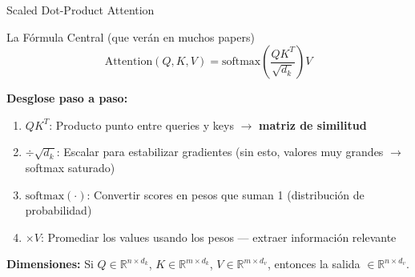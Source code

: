 \documentclass[aspectratio=169]{beamer}
\begin{document}
\begin{frame}{Scaled Dot-Product Attention}
    \begin{block}{La Fórmula Central (que verán en muchos papers)}
        \begin{equation*}
            \text{Attention}(Q, K, V) = \text{softmax}\left(\frac{QK^T}{\sqrt{d_k}}\right)V
        \end{equation*}
    \end{block}
    
    \vspace{0.2cm}
    \textbf{Desglose paso a paso:}
    \begin{enumerate}
        \item $QK^T$: Producto punto entre queries y keys $\rightarrow$ \textbf{matriz de similitud}
        \item $\div \sqrt{d_k}$: Escalar para estabilizar gradientes (sin esto, valores muy grandes $\rightarrow$ softmax saturado)
        \item $\text{softmax}(\cdot)$: Convertir scores en pesos que suman 1 (distribución de probabilidad)
        \item $\times V$: Promediar los values usando los pesos --- extraer información relevante
    \end{enumerate}
    
    \vspace{0.3cm}
    \textbf{Dimensiones:} Si $Q \in \mathbb{R}^{n \times d_k}$, $K \in \mathbb{R}^{m \times d_k}$, $V \in \mathbb{R}^{m \times d_v}$, entonces la salida $\in \mathbb{R}^{n \times d_v}$.
\end{frame}
\end{document}
